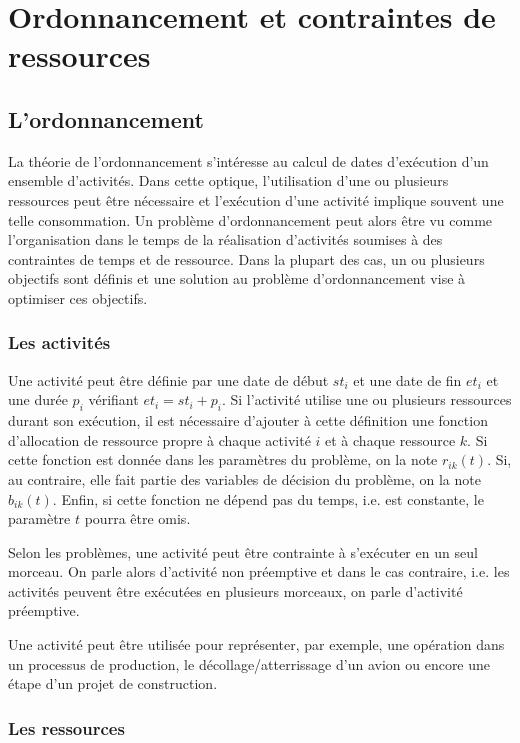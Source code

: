 \section{Ordonnancement et contraintes de ressources}
\label{sec:ordo}
\subsection{L'ordonnancement}

La théorie de l'ordonnancement s'intéresse au calcul de dates
d'exécution d'un ensemble d'activités. Dans cette optique,
l'utilisation d'une ou plusieurs ressources peut être nécessaire et
l'exécution d'une activité implique souvent une telle consommation. Un
problème d'ordonnancement peut alors être vu comme l'organisation dans
le temps de la réalisation d'activités soumises à des contraintes de
temps et de ressource. Dans la plupart des cas, un ou plusieurs
objectifs sont définis et une solution au problème d'ordonnancement 
vise à optimiser ces objectifs.
 
\subsubsection{Les activités}

Une activité peut être définie par une date de début $st_i$ et une date
de fin $et_i$ et une durée $p_i$ vérifiant $et_i=st_i+p_i$. Si
l'activité utilise une ou plusieurs ressources durant son exécution, il
est nécessaire d'ajouter à cette définition une fonction d'allocation
de ressource propre à chaque activité $i$ et à chaque
ressource $k$. Si cette fonction est donnée dans les paramètres du
problème, on la note $r_{ik}(t)$. Si, au contraire, elle fait partie
des variables de décision du problème, on la note $b_{ik}(t)$. Enfin,
si cette fonction ne dépend pas du temps, i.e. est constante, le
paramètre $t$ pourra être omis. 

Selon les problèmes, une activité peut être contrainte à s'exécuter en
un seul morceau. On parle alors d'activité non préemptive et dans le
cas contraire, i.e. les activités peuvent être exécutées en plusieurs
morceaux, on parle d'activité préemptive.

Une activité peut être utilisée pour représenter, par exemple, une
opération dans un processus de production, le décollage/atterrissage
d'un avion ou encore une étape d'un projet de construction.

\subsubsection{Les ressources}

